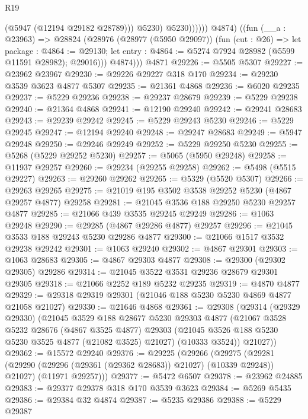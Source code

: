 \begin{lexlean}{R19}
\begin{coremodule}
                        (@5947 (@12194 @29182 @28789)))
                      @5230)
                    @5230))))))
          @4874)
        ((fun (__a : @23963) =>
        @28824
          (@28976
            (@28977 (@5950 @29097))
            (fun (cut : @26) =>
            let package : @4864 := @29130;
            let entry : @4864 := @5274 @7924 @28982 (@5599 @11591 @28982); @29016)))
          @4874)))
    @4871
@29226 := @5505 @5307
@29227 := @23962 @23967
@29230 := @29226 @29227 @318 @170
@29234 := @29230 @3539 @3623 @4877 @5307
@29235 := @21361 @4868
@29236 := @6020 @29235
@29237 := @5229 @29236
@29238 := @29237 @28679
@29239 := @5229 @29238
@29240 := @21364 @4868
@29241 := @12190 @29240
@29242 := @29241 @28683
@29243 := @29239 @29242
@29245 := @5229 @29243 @5230
@29246 := @5229 @29245
@29247 := @12194 @29240
@29248 := @29247 @28683
@29249 := @5947 @29248
@29250 := @29246 @29249
@29252 := @5229 @29250 @5230
@29255 := @5268 (@5229 @29252 @5230)
@29257 := @5065 (@5950 @29248)
@29258 := @11937 @29257
@29260 := @29234 (@29255 @29258)
@29262 := @5498 (@5515 @29227)
@29263 := @29260 @29262
@29265 := @5329 (@5520 @5307)
@29266 := @29263 @29265
@29275 := @21019 @195 @3502 @3538 @29252 @5230 (@4867 @29257 @4877) @29258
@29281 := @21045 @3536 @188 @29250 @5230 @29257 @4877
@29285 := @21066 @439 @3535 @29245 @29249
@29286 := @1063 @29248
@29290 := @29285 (@4867 @29286 @4877) @29257
@29296 := @21045 @3533 @188 @29243 @5230 @29286 @4877
@29300 := @21066 @1517 @3532 @29238 @29242
@29301 := @1063 @29240
@29302 := @4867 @29301
@29303 := @1063 @28683
@29305 := @4867 @29303 @4877
@29308 := @29300 (@29302 @29305) @29286
@29314 := @21045 @3522 @3531 @29236 @28679 @29301 @29305
@29318 := @21066 @2252 @189 @5232 @29235
@29319 := @4870 @4877
@29329 := @29318 @29319 @29301 (@21046 @188 @5230 @5230 @4869 @4877 @21058 @21027)
@29330 := @21646 @4868
@29361 := @29308
    (@29314
      (@29329 @29330)
      (@21045
        @3529
        @188
        @28677
        @5230
        @29303
        @4877
        (@21067
          @3528
          @5232
          @28676
          (@4867 @3525 @4877)
          @29303
          (@21045 @3526 @188 @5230 @5230 @3525 @4877 (@21082 @3525) @21027)
          (@10333 @3524))
        @21027))
@29362 := @15572 @29240
@29376 := @29225
    (@29266
      (@29275
        (@29281 (@29290 (@29296 (@29361 (@29362 @28683)) @21027) (@10339 @29248)) @21027)
        (@11971 @29257)))
@29377 := @5472 @6507
@29378 := @23962 @24885
@29383 := @29377 @29378 @318 @170 @3539 @3623
@29384 := @5269 @5435
@29386 := @29384 @32 @4874
@29387 := @5235 @29386
@29388 := @5229 @29387

\end{coremodule}
\end{lexlean}
